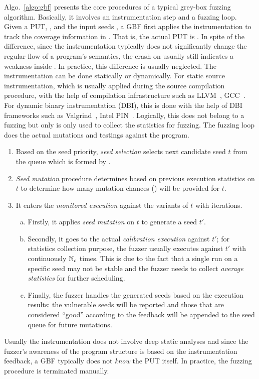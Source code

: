 Algo.~\ref{algo:gbf} presents the core procedures of a typical grey-box fuzzing algorithm. Basically, it involves an instrumentation step and a fuzzing loop.
Given a PUT, \ProgO, and the input seeds \Seeds, a GBF first applies the instrumentation to track the coverage information in \ProgO. That is, the actual PUT is \Prog. In spite of the difference, since the instrumentation typically does not significantly change the regular flow of a program's semantics, the crash on \Prog usually still indicates a weakness inside \ProgO. In practice, this difference is usually neglected.
The instrumentation can be done statically or dynamically. For static source instrumentation, which is usually applied during the source compilation procedure, with the help of compilation infrastructure such as LLVM~\cite{Lattner:2004:LCF:977395.977673}, GCC~\cite{gcc}. For dynamic binary instrumentation (DBI), this is done with the help of DBI frameworks such as Valgrind~\cite{valgrind}, Intel PIN~\cite{pin}. Logically, this does not belong to a fuzzing but only is only used to collect the statistics for fuzzing.
The fuzzing loop does the actual mutations and testings against the program.
\begin{enumerate}[1.]
	\item Based on the seed priority, \emph{seed selection} selects next candidate seed $t$ from the queue which is formed by \Seeds.
	\item \emph{Seed mutation} procedure determines based on previous execution statistics on $t$ to determine how many mutation chances (\mutChance) will be provided for $t$.
	\item It enters the \emph{monitored execution} against the variants of $t$ with \mutChance iterations. 
	\begin{enumerate}[a)]
	\item Firstly, it applies \emph{seed mutation} on $t$ to generate a seed $t'$. 
	\item Secondly, it goes to the actual \emph{calibration execution} against $t'$; for statistics collection purpose, the fuzzer usually executes \Prog against $t'$ with continuously $\mathbb{N}_{c}$ times. This is due to the fact that a single run on a specific seed may not be stable and the fuzzer needs to collect \emph{average statistics} for further scheduling.
	\item Finally, the fuzzer handles the generated seeds based on the execution results: the vulnerable seeds will be reported and those that are considered ``good'' according to the feedback will be appended to the seed queue for future mutations.
	\end{enumerate}
\end{enumerate}
Usually the instrumentation does not involve deep static analyses and since the fuzzer's awareness of the program structure is based on the instrumentation feedback, a GBF typically does not \emph{know} the PUT itself. In practice, the fuzzing procedure is terminated manually.

